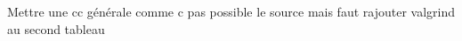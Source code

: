 Mettre une cc générale comme c pas possible le source mais faut rajouter
valgrind au second tableau



